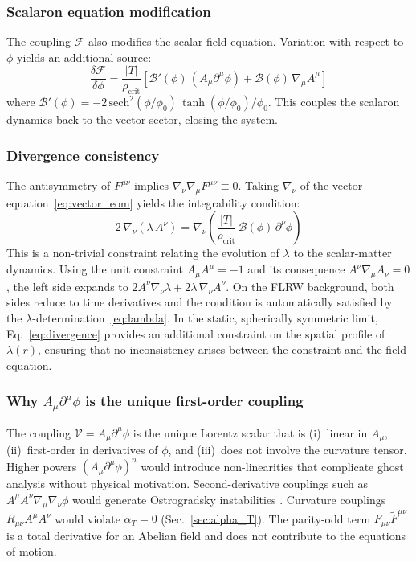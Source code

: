 \documentclass[aps,prd,twocolumn,superscriptaddress,nofootinbib]{revtex4-2}
\begin{document}
\subsubsection{Scalaron equation modification}

The coupling $\mathcal{F}$ also modifies the scalar field equation. Variation with respect to $\phi$ yields an additional source:
\begin{equation}
\frac{\delta\mathcal{F}}{\delta\phi} = \frac{|T|}{\rho_{\mathrm{crit}}}\left[\mathcal{B}'(\phi)\,(A_\mu\partial^\mu\phi) + \mathcal{B}(\phi)\,\nabla_\mu A^\mu\right]
\label{eq:scalar_source}
\end{equation}
where $\mathcal{B}'(\phi) = -2\,\mathrm{sech}^2(\phi/\phi_0)\,\tanh(\phi/\phi_0)/\phi_0$. This couples the scalaron dynamics back to the vector sector, closing the system.

\subsubsection{Divergence consistency}

The antisymmetry of $F^{\mu\nu}$ implies $\nabla_\nu\nabla_\mu F^{\mu\nu} \equiv 0$. Taking $\nabla_\nu$ of the vector equation~\eqref{eq:vector_eom} yields the integrability condition:
\begin{equation}
2\,\nabla_\nu(\lambda\,A^\nu) = \nabla_\nu\!\left(\frac{|T|}{\rho_{\mathrm{crit}}}\,\mathcal{B}(\phi)\,\partial^\nu\phi\right)
\label{eq:divergence}
\end{equation}
This is a non-trivial constraint relating the evolution of $\lambda$ to the scalar-matter dynamics. Using the unit constraint $A_\mu A^\mu = -1$ and its consequence $A^\nu\nabla_\mu A_\nu = 0$, the left side expands to $2A^\nu\nabla_\nu\lambda + 2\lambda\,\nabla_\nu A^\nu$. On the FLRW background, both sides reduce to time derivatives and the condition is automatically satisfied by the $\lambda$-determination~\eqref{eq:lambda}. In the static, spherically symmetric limit, Eq.~\eqref{eq:divergence} provides an additional constraint on the spatial profile of $\lambda(r)$, ensuring that no inconsistency arises between the constraint and the field equation.

\subsubsection{Why $A_\mu\partial^\mu\phi$ is the unique first-order coupling}

The coupling $\mathcal{V} = A_\mu\partial^\mu\phi$ is the unique Lorentz scalar that is (i)~linear in $A_\mu$, (ii)~first-order in derivatives of $\phi$, and (iii)~does not involve the curvature tensor. Higher powers $(A_\mu\partial^\mu\phi)^n$ would introduce non-linearities that complicate ghost analysis without physical motivation. Second-derivative couplings such as $A^\mu A^\nu\nabla_\mu\nabla_\nu\phi$ would generate Ostrogradsky instabilities \cite{Woodard2015}. Curvature couplings $R_{\mu\nu}A^\mu A^\nu$ would violate $\alpha_T = 0$ (Sec.~\ref{sec:alpha_T}). The parity-odd term $F_{\mu\nu}\tilde{F}^{\mu\nu}$ is a total derivative for an Abelian field and does not contribute to the equations of motion.
\end{document}

